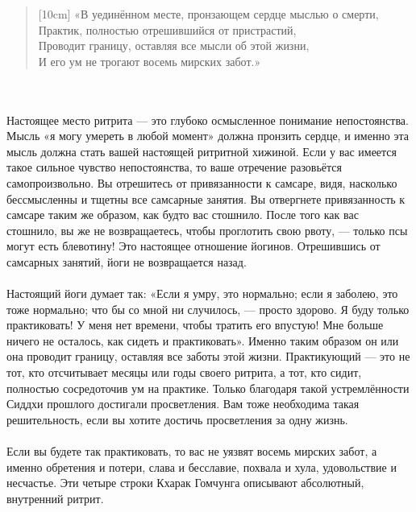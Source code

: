 \begin{verse}[10cm]
«В уединённом месте, пронзающем сердце мыслью о смерти, \\
Практик, полностью отрешившийся от пристрастий, \\
Проводит границу, оставляя все мысли об этой жизни, \\
И его ум не трогают восемь мирских забот.»
\end{verse}
\\ \\ Настоящее место ритрита — это глубоко осмысленное понимание непостоянства. Мысль «я могу умереть в любой момент» должна пронзить сердце, и именно эта мысль должна стать вашей настоящей ритритной хижиной. Если у вас имеется такое сильное чувство непостоянства, то ваше отречение разовьётся самопроизвольно. Вы отрешитесь от привязанности к самсаре, видя, насколько бессмысленны и тщетны все самсарные занятия. Вы отвергнете привязанность к самсаре таким же образом, как будто вас стошнило. После того как вас стошнило, вы же не возвращаетесь, чтобы проглотить свою рвоту, — только псы могут есть блевотину! Это настоящее отношение йогинов. Отрешившись от самсарных занятий, йоги не возвращается назад.
\\ \\ Настоящий йоги думает так: «Если я умру, это нормально; если я заболею, это тоже нормально; что бы со мной ни случилось, — просто здорово. Я буду только практиковать! У меня нет времени, чтобы тратить его впустую! Мне больше ничего не осталось, как сидеть и практиковать». Именно таким образом он или она проводит границу, оставляя все заботы этой жизни. Практикующий — это не тот, кто отсчитывает месяцы или годы своего ритрита, а тот, кто сидит, полностью сосредоточив ум на практике. Только благодаря такой устремлённости Сиддхи прошлого достигали просветления. Вам тоже необходима такая решительность, если вы хотите достичь просветления за одну жизнь.
\\ \\ Если вы будете так практиковать, то вас не уязвят восемь мирских забот, а именно обретения и потери, слава и бесславие, похвала и хула, удовольствие и несчастье. Эти четыре строки Кхарак Гомчунга описывают абсолютный, внутренний ритрит.
